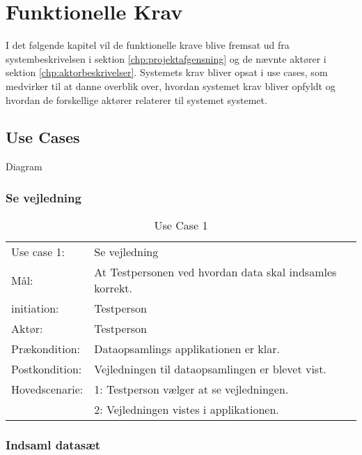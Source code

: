 \chapter{Funktionelle Krav}
\label{chp:funktionellen}
I det følgende kapitel vil de funktionelle krave blive fremsat ud fra systembeskrivelsen i sektion \ref{chp:projektafgensning} og de nævnte aktører i sektion \ref{chp:aktorbeskrivelser}. Systemets krav bliver opsat i use cases, som medvirker til at danne overblik over, hvordan systemet krav bliver opfyldt og hvordan de forskellige aktører relaterer til systemet systemet.    
\section{Use Cases}
Diagram

\subsection{Se vejledning}
\bgroup
\def\arraystretch{1.8}
\begin{center}
	\begin{table}[htbp]
		\begin{tabular}{lp{10cm}}
			\rowcolor{grey} Use case 1:	& Se vejledning \\
			Mål:	& At Testpersonen ved hvordan data skal indsamles korrekt. \\
			initiation:	& Testperson\\
			Aktør: & Testperson\\
			Prækondition: & Dataopsamlings applikationen er klar.\\
			Postkondition: & Vejledningen til dataopsamlingen er blevet vist.\\
			Hovedscenarie: & 1: Testperson vælger at se vejledningen.\\
			& 2: Vejledningen vistes i applikationen.\\
		\end{tabular}
		\caption{Use Case 1}
	\end{table}
\end{center}

\subsection{Indsaml datasæt}

